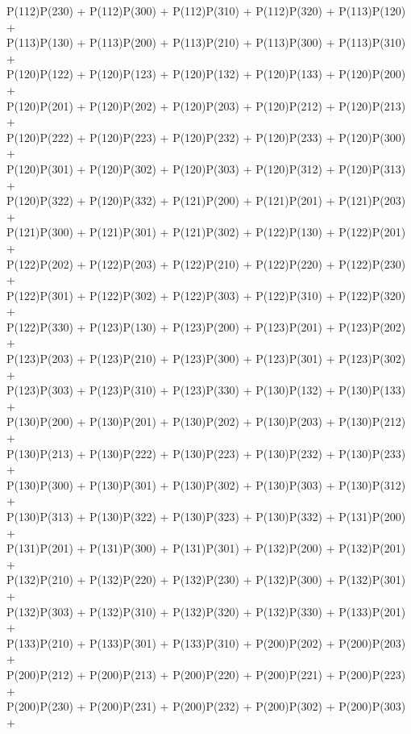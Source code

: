 P(112)P(230) + P(112)P(300) + P(112)P(310) + P(112)P(320) + P(113)P(120) +\\
P(113)P(130) + P(113)P(200) + P(113)P(210) + P(113)P(300) + P(113)P(310) +\\
P(120)P(122) + P(120)P(123) + P(120)P(132) + P(120)P(133) + P(120)P(200) +\\
P(120)P(201) + P(120)P(202) + P(120)P(203) + P(120)P(212) + P(120)P(213) +\\
P(120)P(222) + P(120)P(223) + P(120)P(232) + P(120)P(233) + P(120)P(300) +\\
P(120)P(301) + P(120)P(302) + P(120)P(303) + P(120)P(312) + P(120)P(313) +\\
P(120)P(322) + P(120)P(332) + P(121)P(200) + P(121)P(201) + P(121)P(203) +\\
P(121)P(300) + P(121)P(301) + P(121)P(302) + P(122)P(130) + P(122)P(201) +\\
P(122)P(202) + P(122)P(203) + P(122)P(210) + P(122)P(220) + P(122)P(230) +\\
P(122)P(301) + P(122)P(302) + P(122)P(303) + P(122)P(310) + P(122)P(320) +\\
P(122)P(330) + P(123)P(130) + P(123)P(200) + P(123)P(201) + P(123)P(202) +\\
P(123)P(203) + P(123)P(210) + P(123)P(300) + P(123)P(301) + P(123)P(302) +\\
P(123)P(303) + P(123)P(310) + P(123)P(330) + P(130)P(132) + P(130)P(133) +\\
P(130)P(200) + P(130)P(201) + P(130)P(202) + P(130)P(203) + P(130)P(212) +\\
P(130)P(213) + P(130)P(222) + P(130)P(223) + P(130)P(232) + P(130)P(233) +\\
P(130)P(300) + P(130)P(301) + P(130)P(302) + P(130)P(303) + P(130)P(312) +\\
P(130)P(313) + P(130)P(322) + P(130)P(323) + P(130)P(332) + P(131)P(200) +\\
P(131)P(201) + P(131)P(300) + P(131)P(301) + P(132)P(200) + P(132)P(201) +\\
P(132)P(210) + P(132)P(220) + P(132)P(230) + P(132)P(300) + P(132)P(301) +\\
P(132)P(303) + P(132)P(310) + P(132)P(320) + P(132)P(330) + P(133)P(201) +\\
P(133)P(210) + P(133)P(301) + P(133)P(310) + P(200)P(202) + P(200)P(203) +\\
P(200)P(212) + P(200)P(213) + P(200)P(220) + P(200)P(221) + P(200)P(223) +\\
P(200)P(230) + P(200)P(231) + P(200)P(232) + P(200)P(302) + P(200)P(303) +\\
